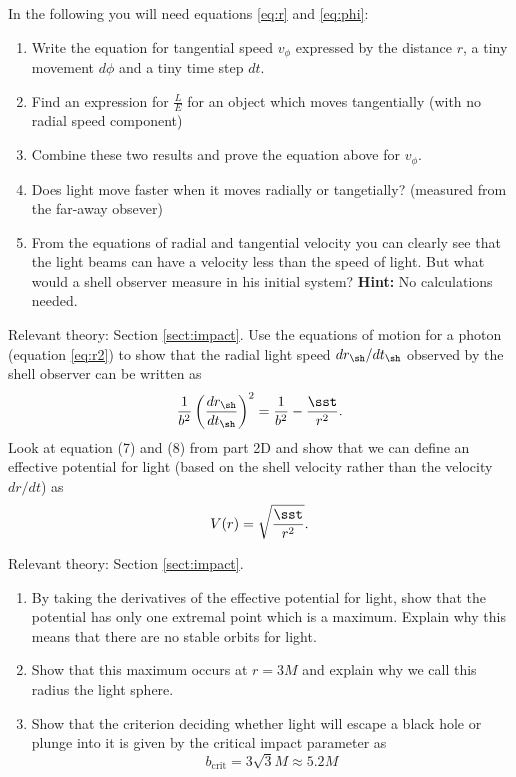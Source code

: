 {\begin{multicols}{2}
In the following you will need equations \ref{eq:r} and \ref{eq:phi}:
\begin{enumerate}
\item Write the equation for tangential speed $v_\phi$ expressed by the distance $r$, a tiny movement $d\phi$ and a tiny time step $dt$.
\item Find an expression for $\frac{L}{E}$ for an object which moves tangentially (with no radial speed component)
\item Combine these two results and prove the equation above for $v_\phi$.
\item Does light move faster when it moves radially or tangetially? (measured from the far-away obsever)
\item From the equations of radial and tangential velocity you can clearly see that the light beams can have a velocity less than the speed of light. But what would a shell observer measure in his initial system? \textbf{Hint:} No calculations needed.

\end{enumerate}

\vspace{0.5cm}




Relevant theory: Section \ref{sect:impact}.\newline
Use the equations of motion for a photon (equation \ref{eq:r2}) to show that the radial light speed $dr_\sh/dt_\sh$ observed by the shell observer can be written as
\begin{equation}
\label{eq:vrshell}
\frac{1}{b^2}\left(\frac{dr_\sh}{dt_\sh}\right)^2=\frac{1}{b^2}-\frac{\sst}{r^2}.
\end{equation}
Look at equation (7) and (8) from part 2D and show that we can define an effective potential for light (based on the shell velocity rather than the velocity $dr/dt$) as
\[
V(r)=\sqrt{\frac{\sst}{r^2}}.
\]

\vspace{0.5cm}


Relevant theory: Section \ref{sect:impact}.
\begin{enumerate}
\item By taking the derivatives of the effective potential for light, show that the potential has only one extremal point which is a maximum. Explain why this means that there are no stable orbits for light. 
\item Show that this maximum occurs at $r=3M$ and explain why we call this radius the light sphere. 
\item Show that the criterion deciding whether light will escape a black hole or plunge into it is given by the critical impact parameter as
\[
b_\mathrm{crit}=3\sqrt{3}M\approx5.2M
\]
\end{enumerate}


\end{multicols}}

